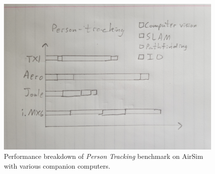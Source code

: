 \begin{figure}[h]
\centering
\includegraphics[width=\linewidth]{figs/perf-breakdown}
\caption{Performance breakdown of \textit{Person Tracking} benchmark on AirSim with various companion computers.}
\label{fig:perf-breakdown}
\end{figure}
